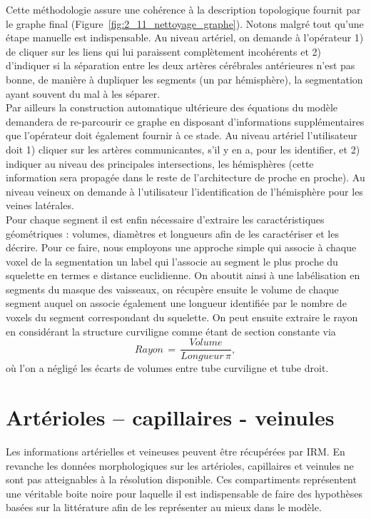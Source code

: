 Cette méthodologie assure une cohérence à la description topologique fournit par le graphe final (Figure~\ref{fig:2_11_nettoyage_graphe}). Notons malgré tout qu’une étape manuelle est indispensable. Au niveau artériel, on demande à l’opérateur 1) de cliquer sur les liens qui lui paraissent complètement incohérents et 2) d’indiquer si la séparation entre les deux artères cérébrales antérieures n’est pas bonne, de manière à dupliquer les segments (un par hémisphère), la segmentation ayant souvent du mal à les séparer.\\
Par ailleurs la construction automatique ultérieure des équations du modèle demandera de re-parcourir ce graphe en disposant d’informations supplémentaires que l’opérateur doit également fournir à ce stade. Au niveau artériel l’utilisateur doit 1) cliquer sur les artères communicantes, s’il y en a, pour les identifier, et 2) indiquer au niveau des principales intersections, les hémisphères (cette information sera propagée dans le reste de l’architecture de proche en proche). Au niveau veineux on demande à l’utilisateur l’identification de l’hémisphère pour les veines latérales.\\
Pour chaque segment il est enfin nécessaire d’extraire les caractéristiques géométriques : volumes, diamètres et longueurs afin de les caractériser et les décrire. Pour ce faire, nous employons une approche simple qui associe à chaque voxel de la segmentation un label qui l’associe au segment le plus proche du squelette en termes e distance euclidienne. On aboutit ainsi à une labélisation en segments du masque des vaisseaux, on récupère ensuite le volume de chaque segment auquel on associe également une longueur identifiée par le nombre de voxels du segment correspondant du squelette. On peut ensuite extraire le rayon en considérant la structure curviligne comme étant de section constante via
\begin{equation}
\label{eq:rayons}
Rayon\,=\,\frac{Volume}{Longueur\,\pi},
\end{equation}
où l’on a négligé les écarts de volumes entre tube curviligne et tube droit. 
\section{Artérioles – capillaires - veinules}
Les informations artérielles et veineuses peuvent être récupérées par IRM. En revanche les données morphologiques sur les artérioles, capillaires et veinules ne sont pas atteignables à la résolution disponible. Ces compartiments représentent une véritable boite noire pour laquelle il est indispensable de faire des hypothèses basées sur la littérature afin de les représenter au mieux dans le modèle.
